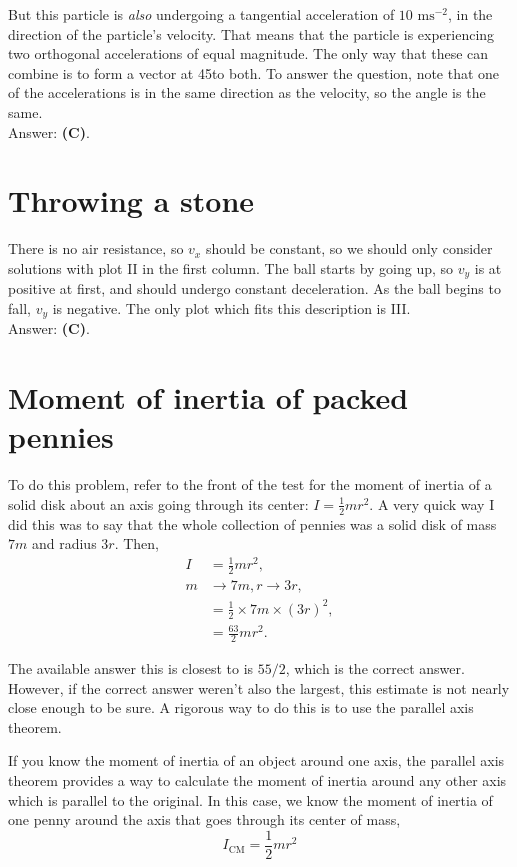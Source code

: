 \documentclass[11pt]{paper}
\newcommand{\answer}[1]{Answer: \textbf{(#1)}.}
\begin{document}
 But this particle is \emph{also} undergoing a tangential acceleration of $10 \text{ ms}^{-2}$, in the direction of the particle's velocity.  That means that the particle is experiencing two orthogonal accelerations of equal magnitude.  The only way that these can combine is to form a vector at 45\degree to both.  To answer the question, note that one of the accelerations is in the same direction as the velocity, so the angle is the same.\\

\answer{C}

\section{Throwing a stone}
There is no air resistance, so $v_x$ should be constant, so we should only consider solutions with plot II in the first column.  The ball starts by going up, so $v_y$ is at positive at first, and should undergo constant deceleration.  As the ball begins to fall, $v_y$ is negative.  The only plot which fits this description is III.\\

\answer{C}

\section{Moment of inertia of packed pennies}
To do this problem, refer to the front of the test for the moment of inertia of a solid disk about an axis going through its center: $I = \frac{1}{2}mr^2$.  A very quick way I did this was to say that the whole collection of pennies was a solid disk of mass $7m$ and radius $3r$.  Then,
\begin{align}
I &= \frac{1}{2} m r^2,\\
m &\rightarrow 7m, r \rightarrow 3r,\\
&= \frac{1}{2} \times 7m \times \left(3r\right)^2,\\
&= \frac{63}{2} m r^2.
\end{align}

The available answer this is closest to is $55/2$, which is the correct answer.  However, if the correct answer weren't also the largest, this estimate is not nearly close enough to be sure.  A rigorous way to do this is to use the parallel axis theorem.

If you know the moment of inertia of an object around one axis, the parallel axis theorem provides a way to calculate the moment of inertia around any other axis which is parallel to the original.  In this case, we know the moment of inertia of one penny around the axis that goes through its center of mass,
\begin{equation}
I_{\text{CM}} = \frac{1}{2}mr^2
\end{equation}
\end{document}
